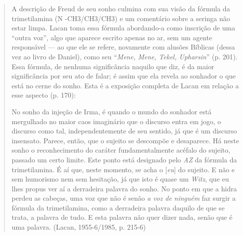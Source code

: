 \begin{quote}
A descrição de Freud de seu sonho culmina com sua visão da fórmula da
trimetilamina (N -CH3/CH3/CH3) e um comentário sobre a seringa não estar
limpa. Lacan toma essa fórmula abordando-a como inscrição de uma ``outra
voz'', algo que aparece escrito apenas no ar, sem um agente responsável
--- ao que ele se refere, novamente com alusões Bíblicas (dessa vez ao
livro de Daniel), como seu ``\emph{Mene, Mene, Tekel, Upharsin}'' (p.
201). Essa fórmula, de nenhuma significância naquilo que diz, é da maior
significância por seu ato de falar; é assim que ela revela ao sonhador o
que está no cerne do sonho. Esta é a exposição completa de Lacan em
relação a esse aspecto (p. 170):

No sonho da injeção de Irma, é quando o mundo do sonhador está
mergulhado no maior caos imaginário que o discurso entra em jogo, o
discurso como tal, independentemente de seu sentido, já que é um
discurso insensato. Parece, então, que o sujeito se descompõe e
desaparece. Há neste sonho o reconhecimento do caráter fundamentalmente
acéfalo do sujeito, passado um certo limite. Este ponto está designado
pelo \emph{AZ} da fórmula da trimetilamina. É aí que, neste momento, se
acha o {[}\emph{eu}{]} do sujeito. E não e sem humorismo nem sem
hesitação, já que isto é quase um \emph{Witz}, que eu lhes propus ver aí
a derradeira palavra do sonho. No ponto em que a hidra perdeu as
cabeças, uma voz que não é senão \emph{a voz de} \emph{ninguém} faz
surgir a fórmula da trimetilamina, como a derradeira palavra daquilo de
que se trata, a palavra de tudo. E esta palavra não quer dizer nada,
senão que é uma palavra. (Lacan, 1955-6/1985, p. 215-6)
\end{quote}

